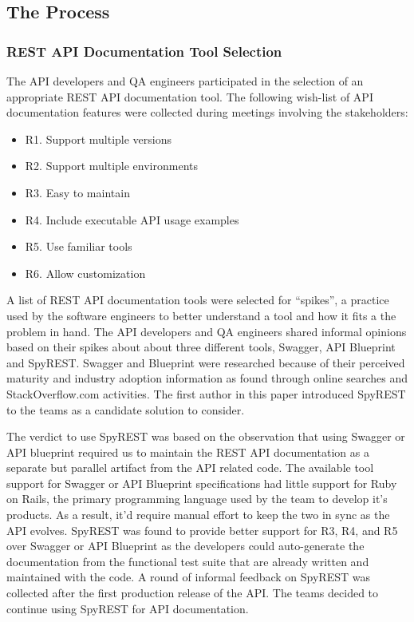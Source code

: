 \documentclass[10pt, conference]{IEEEtran}
\begin{document}
\subsection{The Process} %

\subsubsection{REST API Documentation Tool Selection}
The API developers and QA engineers participated in the selection of an appropriate REST API documentation tool. The following wish-list of API documentation features were collected during meetings involving the stakeholders:

\begin{itemize}
  \item R1. Support multiple versions
  \item R2. Support multiple environments
  \item R3. Easy to maintain
  \item R4. Include executable API usage examples
  \item R5. Use familiar tools
  \item R6. Allow customization
\end{itemize}

A list of REST API documentation tools were selected for ``spikes'', a practice used by the software engineers to better understand a tool and how it fits a the problem in hand. The API developers and QA engineers shared informal opinions based on their spikes about about three different tools, Swagger, API Blueprint and SpyREST. Swagger and Blueprint were researched because of their perceived maturity and industry adoption information as found through online searches and StackOverflow.com activities. The first author in this paper introduced SpyREST to the teams as a candidate solution to consider.

The verdict to use SpyREST was based on the observation that using Swagger or API blueprint required us to maintain the REST API documentation as a separate but parallel artifact from the API related code. The available tool support for Swagger or API Blueprint specifications had little support for Ruby on Rails, the primary programming language used by the team to develop it's products. As a result, it'd require manual effort to keep the two in sync as the API evolves. SpyREST was found to provide better support for R3, R4, and R5 over Swagger or API Blueprint as the developers could auto-generate the documentation from the functional test suite that are already written and maintained with the code. A round of informal feedback on SpyREST was collected after the first production release of the API. The teams decided to continue using SpyREST for API documentation.
\end{document}
